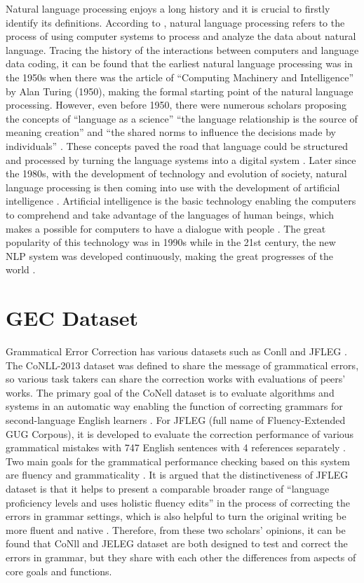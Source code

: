Natural language processing enjoys a long history and it is crucial to firstly identify its definitions. According to \cite{piotrowski2012natural}, natural language processing refers to the process of using computer systems to process and analyze the data about natural language. Tracing the history of the interactions between computers and language data coding, it can be found that the earliest natural language processing was in the 1950s when there was the article of “Computing Machinery and Intelligence” by Alan Turing (1950), making the formal starting point of the natural language processing. However, even before 1950, there were numerous scholars proposing the concepts of “language as a science” “the language relationship is the source of meaning creation” and “the shared norms to influence the decisions made by individuals” 
\cite{piotrowski2012natural}. These concepts paved the road that language could be structured and processed by turning the language systems into a digital system 
\cite{piotrowski2012natural}. Later since the 1980s, with the development of technology and evolution of society, natural language processing is then coming into use with the development of artificial intelligence \cite{kumar2011natural}. Artificial intelligence is the basic technology enabling the computers to comprehend and take advantage of the languages of human beings, which makes a possible for computers to have a dialogue with people \cite{bhirud2017grammar,kumar2011natural}. The great popularity of this technology was in 1990s while in the 21st century, the new NLP system was developed continuously, making the great progresses of the world \cite{kumar2011natural}.

\section{GEC Dataset}
Grammatical Error Correction has various datasets such as Conll and JFLEG \cite{ng2014conll,napoles2017jfleg}. The CoNLL-2013 dataset was defined to share the message of grammatical errors, so various task takers can share the correction works with evaluations of peers’ works. The primary goal of the CoNell dataset is to evaluate algorithms and systems in an automatic way enabling the function of correcting grammars for second-language English learners \cite{ng2014conll}. For JFLEG (full name of Fluency-Extended GUG Corpous), it is developed to evaluate the correction performance of various grammatical mistakes with 747 English sentences with 4 references separately \cite{napoles2017jfleg}. Two main goals for the grammatical performance checking based on this system are fluency and grammaticality \cite{napoles2017jfleg}. It is argued that the distinctiveness of JFLEG dataset is that it helps to present a comparable broader range of “language proficiency levels and uses holistic fluency edits” in the process of correcting the errors in grammar settings, which is also helpful to turn the original writing be more fluent and native \cite{napoles2017jfleg}. Therefore, from these two scholars’ opinions, it can be found that CoNll and JELEG dataset are both designed to test and correct the errors in grammar, but they share with each other the differences from aspects of core goals and functions.

